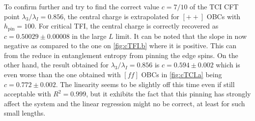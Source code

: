	To confirm further and try to find the correct value $c=7/10$ of the TCI CFT point $\lambda_3/\lambda_I=0.856$, the central charge is extrapolated for $[++]$ OBCs with $h_\text{pin}=100$. For critical TFI, the central charge is correctly recovered as $c=0.50029\pm 0.00008$ in the large $L$ limit. It can be noted that the slope in now negative as compared to the one on \autoref{fig:cTFI.b} where it is positive. This can from the reduce in entanglement entropy from pinning the edge spins. On the other hand, the result obtained for $\lambda_3/\lambda_I=0.856$ is $c= 0.594\pm 0.002$ which is even worse than the one obtained with $[ff]$ OBCs in \autoref{fig:cTCI.a} being $c=0.772 \pm 0.002$. The linearity seems to be slightly off this time even if still acceptable with $R^2=0.999$, but it exhibits the fact that this pinning has strongly affect the system and the linear regression might no be correct, at least for such small lengths.

